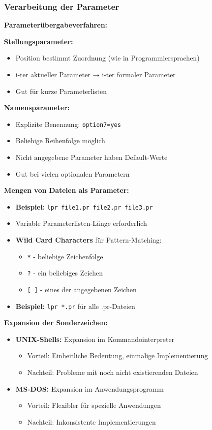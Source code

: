 \documentclass[9pt,a4paper]{extarticle}
\begin{document}
\begin{multicols*}{2}
\subsubsection{Verarbeitung der Parameter}
\textbf{Parameterübergabeverfahren:}

\textbf{Stellungsparameter:}
\begin{itemize}
\item Position bestimmt Zuordnung (wie in Programmiersprachen)
\item i-ter aktueller Parameter → i-ter formaler Parameter
\item Gut für kurze Parameterlisten
\end{itemize}

\textbf{Namensparameter:}
\begin{itemize}
\item Explizite Benennung: \texttt{option7=yes}
\item Beliebige Reihenfolge möglich
\item Nicht angegebene Parameter haben Default-Werte
\item Gut bei vielen optionalen Parametern
\end{itemize}

\textbf{Mengen von Dateien als Parameter:}
\begin{itemize}
\item \textbf{Beispiel:} \texttt{lpr file1.pr file2.pr file3.pr}
\item Variable Parameterlisten-Länge erforderlich
\item \textbf{Wild Card Characters} für Pattern-Matching:
  \begin{itemize}
  \item \texttt{*} - beliebige Zeichenfolge
  \item \texttt{?} - ein beliebiges Zeichen  
  \item \texttt{[ ]} - eines der angegebenen Zeichen
  \end{itemize}
\item \textbf{Beispiel:} \texttt{lpr *.pr} für alle .pr-Dateien
\end{itemize}

\textbf{Expansion der Sonderzeichen:}
\begin{itemize}
\item \textbf{UNIX-Shells:} Expansion im Kommandointerpreter
  \begin{itemize}
  \item Vorteil: Einheitliche Bedeutung, einmalige Implementierung
  \item Nachteil: Probleme mit noch nicht existierenden Dateien
  \end{itemize}
\item \textbf{MS-DOS:} Expansion im Anwendungsprogramm
  \begin{itemize}
  \item Vorteil: Flexibler für spezielle Anwendungen
  \item Nachteil: Inkonsistente Implementierungen
  \end{itemize}
\end{itemize}


\end{multicols*}
\end{document}
